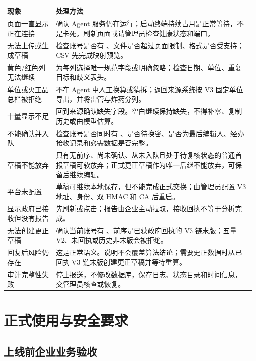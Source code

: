 \documentclass[UTF8,openany,zihao=-4,fontset=none]{ctexbook}
\begin{document}
\begin{longtable}{P{45mm}P{98mm}}
\toprule
\textbf{现象} & \textbf{处理方法}\\
\midrule
页面一直显示正在连接 & 确认 Agent 服务仍在运行；启动终端持续占用是正常等待，不是卡死。刷新页面或请管理员检查健康状态和端口。\\
无法上传或生成草稿 & 检查账号是否有 、文件是否超过页面限制、格式是否受支持；CSV 先完成映射预览。\\
黄色/红色列无法继续 & 为每列选择唯一规范字段或明确忽略；检查日期、单位、重复目标和歧义表头。\\
单位或火工品总栏被拒绝 & 不在 Agent 中人工换算或猜拆；返回来源系统按 V3 固定单位导出，并将雷管与炸药分列。\\
十量显示不足 & 回到来源确认缺失字段。空白继续保持缺失，不得补零、复制历史或由模型估算。\\
不能确认并入队 & 检查账号是否同时有 、是否待换密、是否为最后编辑人、经办接收记录和必需数据是否完整。\\
草稿不能放弃 & 只有无前序、尚未确认、从未入队且处于待复核状态的普通首报草稿可软放弃；正式更正草稿作为唯一后继不能放弃，可保留后继续编辑。\\
平台未配置 & 草稿可继续本地保存，但不能完成正式交换；由管理员配置 V3 地址、身份、双 HMAC 和 CA 后重启。\\
显示政府已接收但没有报告 & 先刷新或点击；报告由企业主动拉取，接收回执不等于分析完成。\\
无法创建更正草稿 & 确认当前账号有 、前序是已获政府回执的 V3 链末版；五量 V2、未回执或历史非末版会被拒绝。\\
回复后风险仍存在 & 这是正常语义。说明不会覆盖算法结论；需要更正数据时从已回执 V3 链末版创建更正草稿并等待重算。\\
审计完整性失败 & 停止报送，不修改数据库，保存日志、状态目录和时间信息，交管理员核查或恢复。\\
\bottomrule
\end{longtable}

\chapter{正式使用与安全要求}

\section{上线前企业业务验收}
\end{document}
